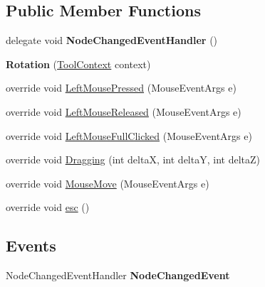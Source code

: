 \subsection*{Public Member Functions}
\begin{DoxyCompactItemize}
\item 
\hypertarget{class_interface_graphique_1_1_tools_1_1_rotation_a250629383cc2d9ae10cf56e6fdd1c8ed}{}delegate void {\bfseries Node\+Changed\+Event\+Handler} ()\label{class_interface_graphique_1_1_tools_1_1_rotation_a250629383cc2d9ae10cf56e6fdd1c8ed}

\item 
\hypertarget{class_interface_graphique_1_1_tools_1_1_rotation_ae04222491ac92fdfc494a6f794bfbb9a}{}{\bfseries Rotation} (\hyperlink{class_interface_graphique_1_1_tools_1_1_tool_context}{Tool\+Context} context)\label{class_interface_graphique_1_1_tools_1_1_rotation_ae04222491ac92fdfc494a6f794bfbb9a}

\item 
override void \hyperlink{class_interface_graphique_1_1_tools_1_1_rotation_aade19712f68677d50299f598245bced2}{Left\+Mouse\+Pressed} (Mouse\+Event\+Args e)
\item 
override void \hyperlink{class_interface_graphique_1_1_tools_1_1_rotation_a012cd3e91e09356e2ec1a7914ec83b77}{Left\+Mouse\+Released} (Mouse\+Event\+Args e)
\item 
override void \hyperlink{class_interface_graphique_1_1_tools_1_1_rotation_a6f39a2956e6a6b1d493e1908e08f1fda}{Left\+Mouse\+Full\+Clicked} (Mouse\+Event\+Args e)
\item 
override void \hyperlink{class_interface_graphique_1_1_tools_1_1_rotation_a3ab72aad0c7d78fad3e7544ef67bffd7}{Dragging} (int delta\+X, int delta\+Y, int delta\+Z)
\item 
override void \hyperlink{class_interface_graphique_1_1_tools_1_1_rotation_a756456f57a12c3e9b9606d9b63023f0f}{Mouse\+Move} (Mouse\+Event\+Args e)
\item 
override void \hyperlink{class_interface_graphique_1_1_tools_1_1_rotation_af190de2985cd4d21d334df52df8d48d4}{esc} ()
\end{DoxyCompactItemize}
\subsection*{Events}
\begin{DoxyCompactItemize}
\item 
\hypertarget{class_interface_graphique_1_1_tools_1_1_rotation_a872ea0b6b41562ada00644be890a7f7c}{}Node\+Changed\+Event\+Handler {\bfseries Node\+Changed\+Event}\label{class_interface_graphique_1_1_tools_1_1_rotation_a872ea0b6b41562ada00644be890a7f7c}

\end{DoxyCompactItemize}


